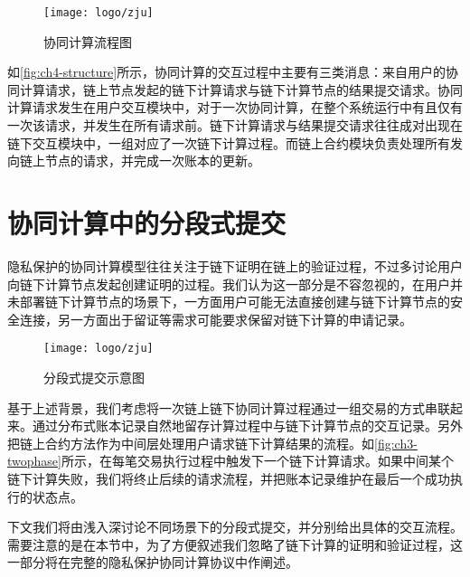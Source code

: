 \begin{figure}[htbp]
    \centering
    \texttt{[image: logo/zju]}
    \caption{\label{fig:ch4-structure}协同计算流程图}
\end{figure}

如\autoref{fig:ch4-structure}所示，协同计算的交互过程中主要有三类消息：来自用户的协同计算请求，链上节点发起的链下计算请求与链下计算节点的结果提交请求。协同计算请求发生在用户交互模块中，对于一次协同计算，在整个系统运行中有且仅有一次该请求，并发生在所有请求前。链下计算请求与结果提交请求往往成对出现在链下交互模块中，一组对应了一次链下计算过程。而链上合约模块负责处理所有发向链上节点的请求，并完成一次账本的更新。

\section{协同计算中的分段式提交}
隐私保护的协同计算模型往往关注于链下证明在链上的验证过程，不过多讨论用户向链下计算节点发起创建证明的过程。我们认为这一部分是不容忽视的，在用户并未部署链下计算节点的场景下，一方面用户可能无法直接创建与链下计算节点的安全连接，另一方面出于留证等需求可能要求保留对链下计算的申请记录。

\begin{figure}[htbp]
    \centering
    \texttt{[image: logo/zju]}
    \caption{\label{fig:ch3-twophase}分段式提交示意图}
\end{figure}

基于上述背景，我们考虑将一次链上链下协同计算过程通过一组交易的方式串联起来。通过分布式账本记录自然地留存计算过程中与链下计算节点的交互记录。另外把链上合约方法作为中间层处理用户请求链下计算结果的流程。如\autoref{fig:ch3-twophase}所示，在每笔交易执行过程中触发下一个链下计算请求。如果中间某个链下计算失败，我们将终止后续的请求流程，并把账本记录维护在最后一个成功执行的状态点。

下文我们将由浅入深讨论不同场景下的分段式提交，并分别给出具体的交互流程。需要注意的是在本节中，为了方便叙述我们忽略了链下计算的证明和验证过程，这一部分将在完整的隐私保护协同计算协议中作阐述。

